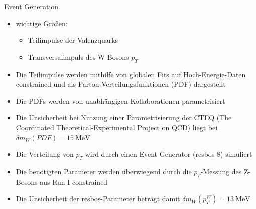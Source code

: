 \documentclass[aspectratio=1610, 9pt]{beamer}
\begin{document}
\begin{frame}{Event Generation}
  \begin{itemize}
    \item wichtige Größen:
    \begin{itemize}
      \item[\rightarrow] Teilimpulse der Valenzquarks
      \item[\rightarrow] Transversalimpuls des W-Bosons $p_T$
    \end{itemize}
    \item Die Teilimpulse werden mithilfe von globalen Fits auf Hoch-Energie-Daten constrained und als Parton-Verteilungsfunktionen (PDF) dargestellt
    \item Die PDFs werden von unabhängigen Kollaborationen parametrisiert
    \item Die Unsicherheit bei Nutzung einer Parametrisierung der CTEQ (The Coordinated Theoretical-Experimental Project on QCD) liegt bei $\delta m_W(PDF) = \SI{15}{\MeV}$
  \end{itemize}




\end{frame}

\begin{frame}
  \begin{itemize}
    \item Die Verteilung von $p_T$ wird durch einen Event Generator (resbos 8) simuliert
    \item Die benötigten Parameter werden überwiegend durch die $p_T$-Messung des Z-Bosons aus Run I constrained
    \item Die Unsicherheit der resbos-Parameter beträgt damit $\delta m_W (p^W_T) = \SI{13}{\MeV}$
  \end{itemize}


\end{frame}
\end{document}
